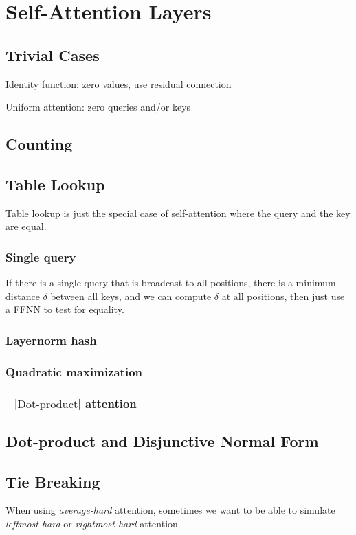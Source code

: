 %
\chapter{Self-Attention Layers}
%

\section{Trivial Cases}

Identity function: zero values, use residual connection

Uniform attention: zero queries and/or keys

\section{Counting}
\label{sec:attn_counting}

\section{Table Lookup}

Table lookup is just the special case of self-attention where the query and the key are equal.

\subsection{Single query}

If there is a single query that is broadcast to all positions,
there is a minimum distance $\delta$ between all keys, and we can compute $\delta$ at all positions,
then just use a FFNN to test for equality.

\citep{chiang-cholak-2022-parity}

\subsection{Layernorm hash}

\citep{merrill-sabharwal-2024-cot}

\subsection{Quadratic maximization}

\citep{barcelo-etal-2024-logical}

\subsection{$-|\text{Dot-product}|$ attention}

\citep{perez-etal-2021-turing}

\section{Dot-product and Disjunctive Normal Form}
\label{sec:att_dnf}

\section{Tie Breaking}

When using \emph{average-hard} attention, sometimes we want to be able to simulate \emph{leftmost-hard} or \emph{rightmost-hard} attention.
